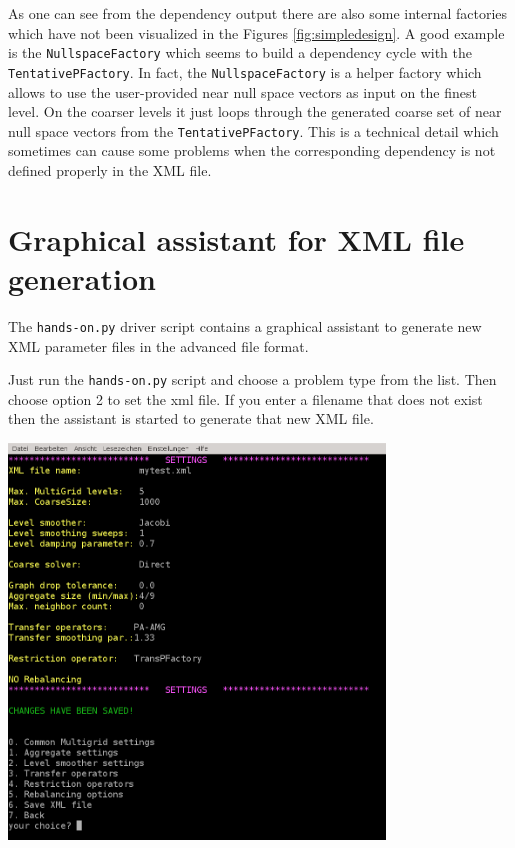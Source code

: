 \documentclass[10pt,fleqn]{book}
\begin{document}
As one can see from the dependency output there are also some internal factories which have not been visualized in the Figures \ref{fig:simpledesign}. A good example is the \verb|NullspaceFactory| which seems to build a dependency cycle with the \verb|TentativePFactory|. In fact, the \verb|NullspaceFactory| is a helper factory which allows to use the user-provided near null space vectors as input on the finest level. On the coarser levels it just loops through the generated coarse set of near null space vectors from the \verb|TentativePFactory|. This is a technical detail which sometimes can cause some problems when the corresponding dependency is not defined properly in the XML file.


\section{Graphical assistant for XML file generation}

The \verb|hands-on.py| driver script contains a graphical assistant to generate new XML parameter files in the advanced \muelu file format.

Just run the \verb|hands-on.py| script and choose a problem type from the list. Then choose option 2 to set the xml file. If you enter a filename that does not exist then the assistant is started to generate that new XML file.

\begin{center}\includegraphics[width=10cm]{pics/tut1_15.png} \end{center}
\end{document}
